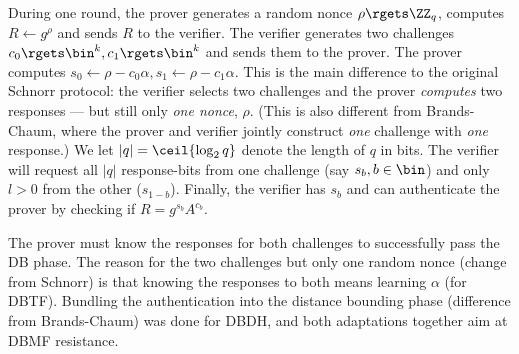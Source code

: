 During one round, the prover generates a random nonce \(\rho\rgets \ZZ_q\), 
computes \(R\gets g^\rho\) and sends \(R\) to the verifier.
The verifier generates two challenges \(c_0\rgets \bin^k, c_1\rgets \bin^k\) 
and sends them to the prover.
The prover computes \(s_0\gets \rho - c_0\alpha, s_1\gets \rho - c_1\alpha\).
This is the main difference to the original Schnorr protocol: the verifier 
selects two challenges and the prover \emph{computes} two responses --- but 
still only \emph{one nonce}, \(\rho\).
(This is also different from Brands-Chaum, where the prover and verifier 
jointly construct \emph{one} challenge with \emph{one} response.)
We let \(|q| = \ceil{\log_2 q}\) denote the length of \(q\) in bits.
The verifier will request all \(|q|\) response-bits from one challenge (say 
\(s_b, b\in \bin\)) and only \(l > 0\) from the other (\(s_{1-b}\)).
Finally, the verifier has \(s_b\) and can authenticate the prover by checking 
if \(R = g^{s_b}A^{c_b}\).

The prover must know the responses for both challenges to successfully pass the 
\ac{DB} phase.
The reason for the two challenges but only one random nonce (change from 
Schnorr) is that knowing the responses to both means learning \(\alpha\) (for
\ac{DBTF}).
Bundling the authentication into the distance bounding phase (difference from 
Brands-Chaum) was done for \ac{DBDH},
and both adaptations together aim at \ac{DBMF} resistance. %

